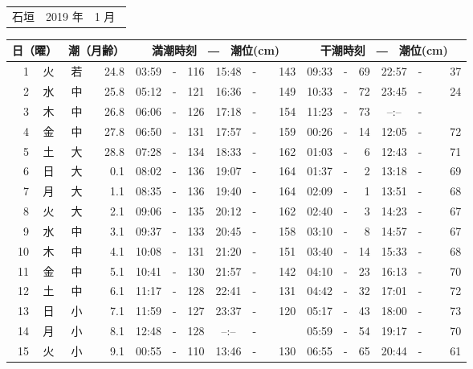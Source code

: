 \documentclass[12pt,a4j]{jsarticle}
\begin{document}
\pagestyle{empty}
 \begin{table}[htbp]
 \begin{tabular}{lcc}
 {\LARGE 石垣 } & {\large 2019 年} & {\large  1 月}\
 \end{tabular}
 \begin{center}
    \begin{tabular}{|rc|cr|ccrccr|ccrccr|}
    \hline
    \multicolumn{2}{|c|}{日（曜）} & \multicolumn{2}{c|}{潮（月齢）} & \multicolumn{6}{c|}{満潮時刻　―　潮位(cm)} & \multicolumn{6}{c|}{干潮時刻　―　潮位(cm)} \\
 \hline
 1 & 火 & 若 & 24.8 &  03:59 &-& 116  &  15:48 &-& 143  &   09:33 &-&  69  &   22:57 &-&  37  \\
 2 & 水 & 中 & 25.8 &  05:12 &-& 121  &  16:36 &-& 149  &   10:33 &-&  72  &   23:45 &-&  24  \\
 3 & 木 & 中 & 26.8 &  06:06 &-& 126  &  17:18 &-& 154  &   11:23 &-&  73  &   --:-- &-&~~~~~ \\
 4 & 金 & 中 & 27.8 &  06:50 &-& 131  &  17:57 &-& 159  &   00:26 &-&  14  &   12:05 &-&  72  \\
 5 & 土 & 大 & 28.8 &  07:28 &-& 134  &  18:33 &-& 162  &   01:03 &-&   6  &   12:43 &-&  71  \\
 6 & 日 & 大 &  0.1 &  08:02 &-& 136  &  19:07 &-& 164  &   01:37 &-&   2  &   13:18 &-&  69  \\
 7 & 月 & 大 &  1.1 &  08:35 &-& 136  &  19:40 &-& 164  &   02:09 &-&   1  &   13:51 &-&  68  \\
 8 & 火 & 大 &  2.1 &  09:06 &-& 135  &  20:12 &-& 162  &   02:40 &-&   3  &   14:23 &-&  67  \\
 9 & 水 & 中 &  3.1 &  09:37 &-& 133  &  20:45 &-& 158  &   03:10 &-&   8  &   14:57 &-&  67  \\
10 & 木 & 中 &  4.1 &  10:08 &-& 131  &  21:20 &-& 151  &   03:40 &-&  14  &   15:33 &-&  68  \\
11 & 金 & 中 &  5.1 &  10:41 &-& 130  &  21:57 &-& 142  &   04:10 &-&  23  &   16:13 &-&  70  \\
12 & 土 & 中 &  6.1 &  11:17 &-& 128  &  22:41 &-& 131  &   04:42 &-&  32  &   17:01 &-&  72  \\
13 & 日 & 小 &  7.1 &  11:59 &-& 127  &  23:37 &-& 120  &   05:17 &-&  43  &   18:00 &-&  73  \\
14 & 月 & 小 &  8.1 &  12:48 &-& 128  &  --:-- &-&~~~~~ &   05:59 &-&  54  &   19:17 &-&  70  \\
15 & 火 & 小 &  9.1 &  00:55 &-& 110  &  13:46 &-& 130  &   06:55 &-&  65  &   20:44 &-&  61  \\

\end{tabular}
\end{center}
\end{table}
\end{document}
